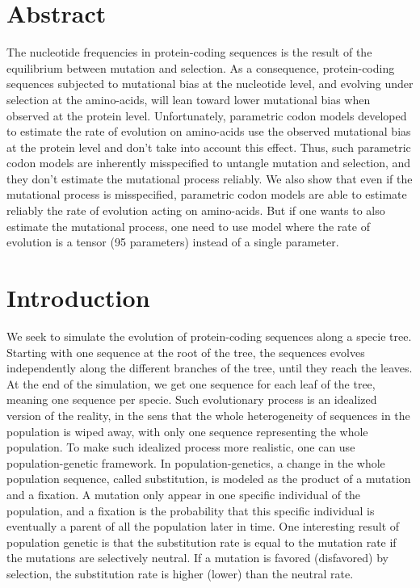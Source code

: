 \section{Abstract}

The nucleotide frequencies in protein-coding sequences is the result of the equilibrium between mutation and selection.
As a consequence, protein-coding sequences subjected to mutational bias at the nucleotide level, and evolving under selection at the amino-acids, will lean toward lower mutational bias when observed at the protein level.
Unfortunately, parametric \gls{codon} models developed to estimate the rate of evolution on amino-acids use the observed mutational bias at the protein level and don't take into account this effect.
Thus, such parametric \gls{codon} models are inherently misspecified to untangle mutation and selection, and they don’t estimate the mutational process reliably.
We also show that even if the mutational process is misspecified, parametric \gls{codon} models are able to estimate reliably the rate of evolution acting on amino-acids.
But if one wants to also estimate the mutational process, one need to use model where the rate of evolution is a tensor (95 parameters) instead of a single parameter.

\section{Introduction}

We seek to simulate the evolution of protein-coding sequences along a specie tree.
Starting with one sequence at the root of the tree, the sequences evolves independently along the different branches of the tree, until they reach the leaves.
At the end of the simulation, we get one sequence for each leaf of the tree, meaning one sequence per specie.
Such evolutionary process is an idealized version of the reality, in the sens that the whole heterogeneity of sequences in the population is wiped away, with only one sequence representing the whole population.
To make such idealized process more realistic, one can use population-genetic framework.
In population-genetics, a change in the whole population sequence, called \gls{substitution}, is modeled as the product of a mutation and a fixation.
A mutation only appear in one specific individual of the population, and a fixation is the probability that this specific individual is eventually a parent of all the population later in time.
One interesting result of population genetic is that the \gls{substitution} rate is equal to the mutation rate if the mutations are selectively \gls{neutral}.
If a mutation is favored (disfavored) by selection, the \gls{substitution} rate is higher (lower) than the \gls{neutral} rate.\\

